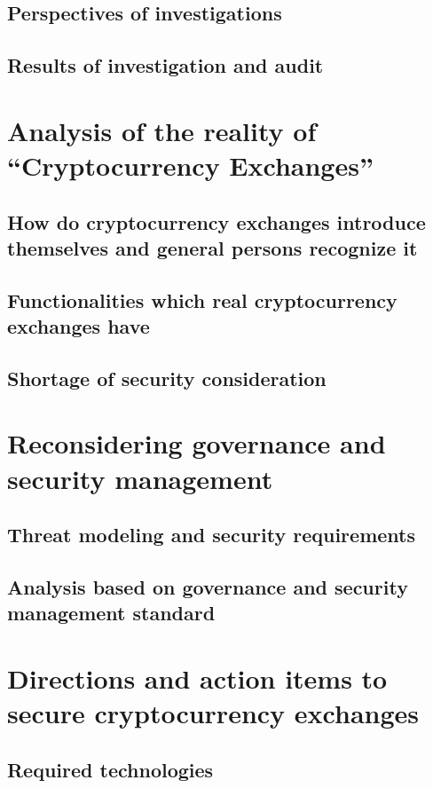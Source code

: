 \documentclass[english]{llncs}
\begin{document}
\subsection{Perspectives of investigations}
\subsection{Results of investigation and audit}



\section{Analysis of the reality of ``Cryptocurrency Exchanges''}
\subsection{How do cryptocurrency exchanges introduce themselves and general persons recognize it}
\subsection{Functionalities which real cryptocurrency exchanges have}
\subsection{Shortage of security consideration}






\section{Reconsidering governance and security management}
\subsection{Threat modeling and security requirements}
\subsection{Analysis based on governance and security management standard}




\section{Directions and action items to secure cryptocurrency exchanges}
\subsection{Required technologies}
\end{document}
